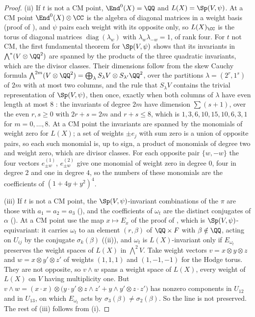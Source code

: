 \begin{proof}
(ii) If $t$ is not a CM point, $\End^{0}(X)=\QQ$ and $L(X)=\Sp(V,\psi)$. At a
CM point $\End^{0}(X)\otimes\CC$ is the algebra of diagonal matrices in a
weight basis (proof of ), and $\psi$ pairs each weight
with its opposite only, so $L(X)_{\CC}$ is the torus of diagonal matrices
$\operatorname{diag}(\lambda_{w})$ with $\lambda_{w}\lambda_{-w}=1$, of rank
four. For $t$ not CM, the first fundamental theorem for $\Sp(V,\psi)$
\cite[Chapter~5]{GW09} shows that its invariants in
${\textstyle\bigwedge^{*}}(V\otimes\QQ^{2})$ are spanned by the products of
the three quadratic invariants, which are the divisor classes. Their
dimensions follow from the skew Cauchy formula
${\textstyle\bigwedge^{2m}}(V\otimes\QQ^{2})=\bigoplus_{\lambda}S_{\lambda}V
\otimes S_{\lambda'}\QQ^{2}$, over the partitions $\lambda=(2^{r},1^{s})$ of
$2m$ with at most two columns, and the rule that $S_{\lambda}V$ contains the
trivial representation of $\Sp(V,\psi)$, then once, exactly when both columns
of $\lambda$ have even length at most $8$ \cite{GW09}: the invariants of
degree $2m$ have dimension $\sum(s+1)$, over the even $r,s\ge0$ with
$2r+s=2m$ and $r+s\le8$, which is $1,3,6,10,15,10,6,3,1$ for
$m=0,\dots,8$. At a CM point the invariants are spanned by the
monomials of weight zero for $L(X)$; a set of weights $\pm e_{j}$ with sum
zero is a union of opposite pairs, so each such monomial is, up to sign, a
product of monomials of degree two and weight zero, which are divisor
classes. For each opposite pair $\{w,-w\}$ the four vectors
$e^{(1)}_{\pm w}$, $e^{(2)}_{\pm w}$ give one monomial of weight zero in
degree $0$, four in degree $2$ and one in degree $4$, so the numbers of these
monomials are the coefficients of $(1+4y+y^{2})^{4}$.

(iii) If $t$ is not a CM point, the $\Sp(V,\psi)$-invariant combinations of the
$\pi$ are those with $a_{1}=a_{2}=a_{3}$ (), and
the coefficients of $\omega_{t}$ are the distinct conjugates of $\alpha$
(). At a CM point use the map $x\mapsto E_{x}$ of the
proof of , which is $\Sp(V,\psi)$-equivariant: it
carries $\omega_{t}$ to an element $(r,\beta)$ of $\QQ\times F$ with
$\beta\notin\QQ$, acting on $U_{ij}$ by the conjugate $\sigma_{k}(\beta)$
((ii)), and $\omega_{t}$ is $L(X)$-invariant only if
$E_{\omega_{t}}$ preserves the weight spaces of $L(X)$ in ${\textstyle\bigwedge^{2}}V$. Take
weight vectors $v=x\otimes y\otimes z$ and $w=x\otimes y'\otimes z'$ of
weights $(1,1,1)$ and $(1,-1,-1)$ for the Hodge torus. They are not
opposite, so $v\wedge w$ spans a weight space of $L(X)$, every weight of
$L(X)$ on $V$ having multiplicity one. But
$v\wedge w=(x\cdot x)\otimes\bigl(y\cdot y'\otimes z\wedge z'+y\wedge y'
\otimes z\cdot z'\bigr)$ has nonzero components in $U_{12}$ and in $U_{13}$,
on which $E_{\omega_{t}}$ acts by $\sigma_{3}(\beta)\ne\sigma_{2}(\beta)$. So
the line is not preserved. The rest of (iii) follows from (i).


\end{proof}
